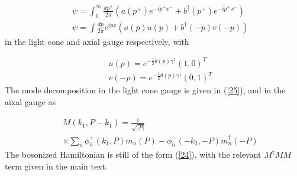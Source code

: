 \documentclass[showpacs,twocolumn,aps,preprintnumbers,letterpaper]{revtex4}
\newcommand{\be}{\begin{equation}}
\newcommand{\ee}{\end{equation}}
\def\be{\begin{eqnarray}}
\def\ee{\end{eqnarray}}
\begin{document}
\be
\label{41}
&&\psi=\int_{0}^{\infty} \frac{dp^{+}}{2\pi}(a(p^+)e^{-ip^+x^-}+b^{\dagger}(p^+)e^{-ip^+x^-})\nonumber\\
&&\psi=\int\frac{dp}{2\pi}e^{ipx}(a(p)u(p)+b^{\dagger}(-p)v(-p))
\ee
in the light cone and axial gauge respectively, with 

\be
\label{42}
&&u(p)=e^{-\frac{1}{2}\theta(p)\gamma^1}(1,0)^T\nonumber\\
&&v(-p)=e^{-\frac{1}{2}\theta(p)\gamma^1}(0,1)^T
\ee
The mode decomposition in the light cone gauge is given in (\ref{25}), and in the aixal gauge as

\be
\label{43}
&&M(k_1,P-k_1)=\frac{1}{\sqrt{|P|}}\nonumber \\ 
&&\times \sum_n \phi^+_n(k_1,P)m_n(P)-\phi^-_n(-k_2,-P)m^{\dagger}_n(-P)
\ee
The bosonized Hamiltonian is still of the form (\ref{24}), 
with the relevant $M^{\dagger}MM$ term given in the main text. 







\end{document}
